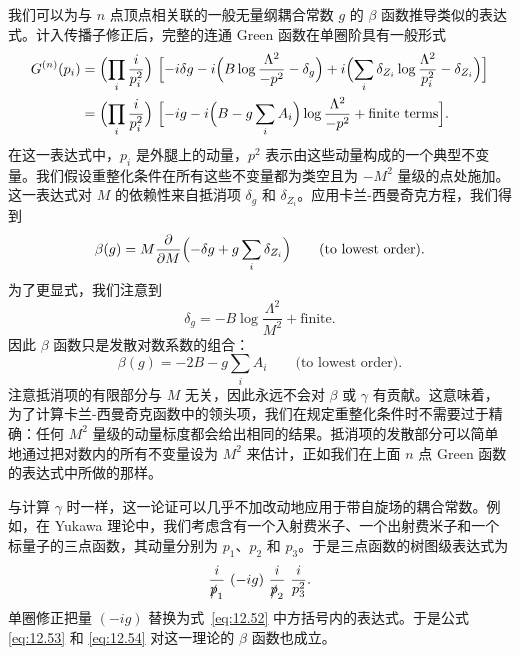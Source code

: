 我们可以为与 $n$ 点顶点相关联的一般无量纲耦合常数 $g$ 的 $\beta$ 函数推导类似的表达式。计入传播子修正后，完整的连通 Green 函数在单圈阶具有一般形式
\begin{equation}
  \begin{aligned}
    G^{(n)}(p_i) &= \Bigl( \prod_i \frac{i}{p_i^2} \Bigr)\ \Bigl[
      -i\delta g - i\Bigl( B\log\frac{\Lambda^2}{-p^2} - \delta_g \Bigr)
      + i\Bigl( \sum_i \delta_{Z_i}\log\frac{\Lambda^2}{p_i^2}
        - \delta_{Z_i} \Bigr) \Bigr]\\
    &= \Bigl( \prod_i \frac{i}{p_i^2} \Bigr)\ \Bigl[ -ig - i\Bigl(
      B - g\sum_i A_i \Bigr)\log\frac{\Lambda^2}{-p^2} + \text{finite terms}
      \Bigr] .
  \end{aligned}
  \label{eq:12.52}
\end{equation}
在这一表达式中，$p_i$ 是外腿上的动量，$p^2$ 表示由这些动量构成的一个典型不变量。我们假设重整化条件在所有这些不变量都为类空且为 $-M^2$ 量级的点处施加。这一表达式对 $M$ 的依赖性来自抵消项 $\delta_g$ 和 $\delta_{Z_i}$。应用卡兰-西曼奇克方程，我们得到
\begin{equation}
  \beta(g) = M\frac{\partial}{\partial M}\Bigl( -\delta g
    + g\sum_i \delta_{Z_i} \Bigr) \qquad \text{(to lowest order)} .
  \label{eq:12.53}
\end{equation}
为了更显式，我们注意到
\begin{equation}
  \delta_g = -B\log\frac{\Lambda^2}{M^2} + \text{finite} .
\end{equation}
因此 $\beta$ 函数只是发散对数系数的组合：
\begin{equation}
  \beta(g) = -2B - g\sum_i A_i \qquad \text{(to lowest order)} .
  \label{eq:12.54}
\end{equation}
注意抵消项的有限部分与 $M$ 无关，因此永远不会对 $\beta$ 或 $\gamma$ 有贡献。这意味着，为了计算卡兰-西曼奇克函数中的领头项，我们在规定重整化条件时不需要过于精确：任何 $M^2$ 量级的动量标度都会给出相同的结果。抵消项的发散部分可以简单地通过把对数内的所有不变量设为 $M^2$ 来估计，正如我们在上面 $n$ 点 Green 函数的表达式中所做的那样。

与计算 $\gamma$ 时一样，这一论证可以几乎不加改动地应用于带自旋场的耦合常数。例如，在 Yukawa 理论中，我们考虑含有一个入射费米子、一个出射费米子和一个标量子的三点函数，其动量分别为 $p_1$、$p_2$ 和 $p_3$。于是三点函数的树图级表达式为
\begin{equation}
  \frac{i}{\slashed{p}_1}\ (-ig)\ \frac{i}{\slashed{p}_2}\ \frac{i}{p_3^2}
  .
  \label{eq:12.55}
\end{equation}
单圈修正把量 $(-ig)$ 替换为式~\eqref{eq:12.52} 中方括号内的表达式。于是公式 \eqref{eq:12.53} 和 \eqref{eq:12.54} 对这一理论的 $\beta$ 函数也成立。

